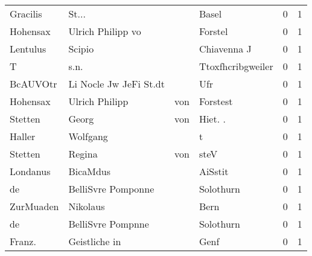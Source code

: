 \documentclass[10pt,a4paper,landscape]{article}
\begin{document}
\begin{longtable}{llllrr}
                 Gracilis &                              St... &             &                                       Basel &          0 &         1 \\
                 Hohensax &                  Ulrich Philipp vo &             &                                     Forstel &          0 &         1 \\
                 Lentulus &                             Scipio &             &                                 Chiavenna J &          0 &         1 \\
                        T &                               s.n. &             &                           Ttoxfhcribgweiler &          0 &         1 \\
                 BcAUVOtr &             Li Nocle Jw JeFi St.dt &             &                                         Ufr &          0 &         1 \\
                 Hohensax &                     Ulrich Philipp &         von &                                    Forstest &          0 &         1 \\
                  Stetten &                              Georg &         von &                                    Hiet. .  &          0 &         1 \\
                   Haller &                           Wolfgang &             &                                           t &          0 &         1 \\
                  Stetten &                             Regina &         von &                                        steV &          0 &         1 \\
                 Londanus &                           BicaMdus &             &                                     AiSstit &          0 &         1 \\
                       de &                 BelliSvre Pomponne &             &                                   Solothurn &          0 &         1 \\
                ZurMuaden &                           Nikolaus &             &                                        Bern &          0 &         1 \\
                       de &                  BelliSvre Pompnne &             &                                   Solothurn &          0 &         1 \\
                   Franz. &                      Geistliche in &             &                                        Genf &          0 &         1 \\

\end{longtable}
\end{document}
